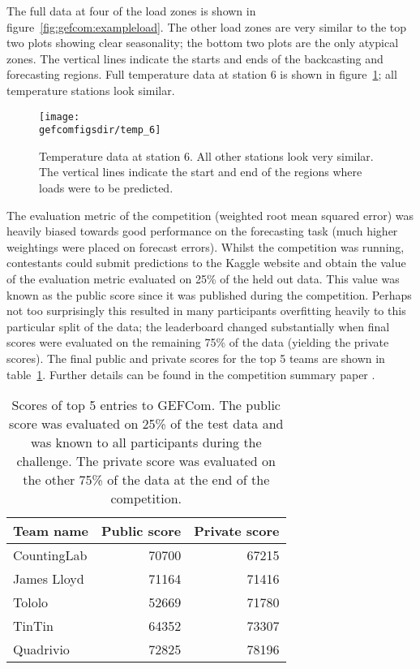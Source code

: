 The full data at four of the load zones is shown in figure~\ref{fig:gefcom:exampleload}.
The other load zones are very similar to the top two plots showing clear seasonality; the bottom two plots are the only atypical zones.
The vertical lines indicate the starts and ends of the backcasting and forecasting regions.
Full temperature data at station 6 is shown in figure~\ref{fig:gefcom:exampletemp}; all temperature stations look similar.

\begin{figure}[ht]
\centering
\texttt{[image: \\gefcomfigsdir/temp\_6]}
\caption[Example temperature data from GEFCom.]{
Temperature data at station 6.
All other stations look very similar.
The vertical lines indicate the start and end of the regions where loads were to be predicted.
}
\label{fig:gefcom:exampletemp}
\end{figure}

The evaluation metric of the competition (weighted root mean squared error) was heavily biased towards good performance on the forecasting task (much higher weightings were placed on forecast errors).
Whilst the competition was running, contestants could submit predictions to the Kaggle website and obtain the value of the evaluation metric evaluated on 25\% of the held out data.
This value was known as the public score since it was published during the competition.
Perhaps not too surprisingly this resulted in many participants overfitting heavily to this particular split of the data; the leaderboard changed substantially when final scores were evaluated on the remaining 75\% of the data (yielding the private scores).
The final public and private scores for the top 5 teams are shown in table~\ref{table:gefcom:scores}.
Further details can be found in the competition summary paper \citep{Hong2014-yf}.

\begin{table}[ht]
  \begin{center}
    \begin{tabular}{l|r|r}
      Team name & Public score & Private score \\
      \hline
      CountingLab & 70700 & 67215 \\
      James Lloyd & 71164 & 71416 \\
      Tololo & 52669 & 71780 \\
      TinTin & 64352 & 73307 \\
      Quadrivio & 72825 & 78196
    \end{tabular}
  \end{center}
  \caption[Scores of top 5 entries to GEFCom]{
    Scores of top 5 entries to GEFCom.
    The public score was evaluated on 25\% of the test data and was known to all participants during the challenge.
    The private score was evaluated on the other 75\% of the data at the end of the competition.}
  \label{table:gefcom:scores}
\end{table}

